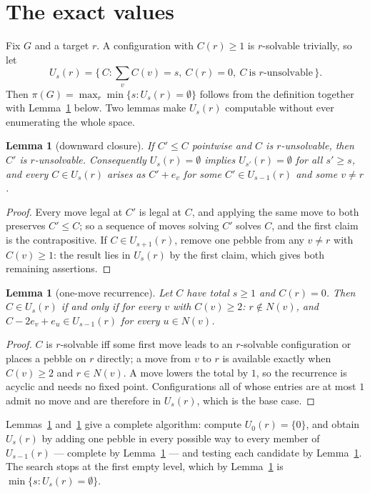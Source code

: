 \documentclass[11pt]{amsart}
\newtheorem{lemma}[theorem]{Lemma}
\theoremstyle{remark}
\begin{document}
\section{The exact values}\label{sec:exhaustive}

Fix $G$ and a target $r$. A configuration with $C(r)\ge1$ is $r$-solvable
trivially, so let
\[
 U_s(r)=\{\,C : \textstyle\sum_v C(v)=s,\ C(r)=0,\ C\ \text{is $r$-unsolvable}\,\}.
\]
Then $\pi(G)=\max_{r}\min\{s : U_s(r)=\emptyset\}$ follows from the definition
together with Lemma~\ref{lem:down} below. Two lemmas make $U_s(r)$ computable
without ever enumerating the whole space.

\begin{lemma}[downward closure]\label{lem:down}
If $C'\le C$ pointwise and $C$ is $r$-unsolvable, then $C'$ is $r$-unsolvable.
Consequently $U_s(r)=\emptyset$ implies $U_{s'}(r)=\emptyset$ for all $s'\ge s$,
and every $C\in U_s(r)$ arises as $C'+e_v$ for some $C'\in U_{s-1}(r)$ and some
$v\ne r$.
\end{lemma}

\begin{proof}
Every move legal at $C'$ is legal at $C$, and applying the same move to both
preserves $C'\le C$; so a sequence of moves solving $C'$ solves $C$, and the
first claim is the contrapositive. If $C\in U_{s+1}(r)$, remove one pebble from
any $v\ne r$ with $C(v)\ge1$: the result lies in $U_s(r)$ by the first claim,
which gives both remaining assertions.
\end{proof}

\begin{lemma}[one-move recurrence]\label{lem:rec}
Let $C$ have total $s\ge1$ and $C(r)=0$. Then $C\in U_s(r)$ if and only if for
every $v$ with $C(v)\ge2$: $r\notin N(v)$, and $C-2e_v+e_u\in U_{s-1}(r)$ for
every $u\in N(v)$.
\end{lemma}

\begin{proof}
$C$ is $r$-solvable iff some first move leads to an $r$-solvable configuration or
places a pebble on $r$ directly; a move from $v$ to $r$ is available exactly when
$C(v)\ge2$ and $r\in N(v)$. A move lowers the total by $1$, so the recurrence is
acyclic and needs no fixed point. Configurations all of whose entries are at most
$1$ admit no move and are therefore in $U_s(r)$, which is the base case.
\end{proof}

Lemmas~\ref{lem:down} and~\ref{lem:rec} give a complete algorithm: compute
$U_0(r)=\{0\}$, and obtain $U_s(r)$ by adding one pebble in every possible way to
every member of $U_{s-1}(r)$ --- complete by Lemma~\ref{lem:down} --- and testing
each candidate by Lemma~\ref{lem:rec}. The search stops at the first empty level,
which by Lemma~\ref{lem:down} is $\min\{s:U_s(r)=\emptyset\}$.
\end{document}
